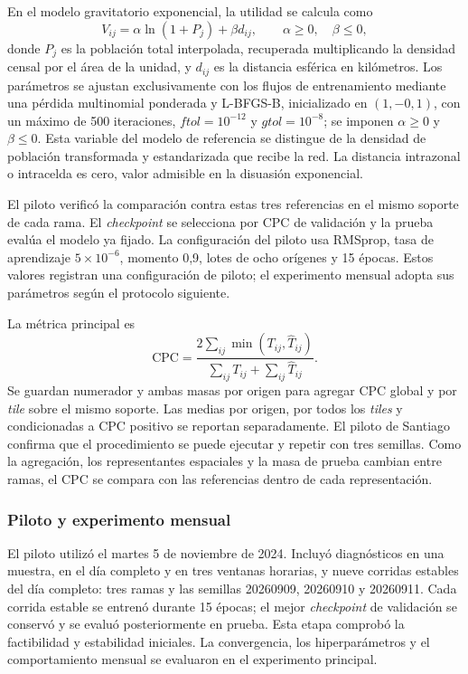 En el modelo gravitatorio exponencial, la utilidad se calcula como
\begin{equation}
    V_{ij}=\alpha\ln(1+P_j)+\beta d_{ij},\qquad \alpha\geq0,\quad\beta\leq0,
    \label{eq:baseline_exponencial}
\end{equation}
donde $P_j$ es la población total interpolada, recuperada multiplicando la densidad censal por el área de la unidad, y $d_{ij}$ es la distancia esférica en kilómetros. Los parámetros se ajustan exclusivamente con los flujos de entrenamiento mediante una pérdida multinomial ponderada y L-BFGS-B, inicializado en $(1,-0{,}1)$, con un máximo de 500 iteraciones, $\textit{ftol}=10^{-12}$ y $\textit{gtol}=10^{-8}$; se imponen $\alpha\geq0$ y $\beta\leq0$. Esta variable del modelo de referencia se distingue de la densidad de población transformada y estandarizada que recibe la red. La distancia intrazonal o intracelda es cero, valor admisible en la disuasión exponencial.

El piloto verificó la comparación contra estas tres referencias en el mismo soporte de cada rama. El \textit{checkpoint} se selecciona por CPC de validación y la prueba evalúa el modelo ya fijado. La configuración del piloto usa RMSprop, tasa de aprendizaje $5\times10^{-6}$, momento 0,9, lotes de ocho orígenes y 15 épocas. Estos valores registran una configuración de piloto; el experimento mensual adopta sus parámetros según el protocolo siguiente.

La métrica principal es
\begin{equation}
    \mathrm{CPC}=\frac{2\sum_{ij}\min(T_{ij},\widehat{T}_{ij})}{\sum_{ij}T_{ij}+\sum_{ij}\widehat{T}_{ij}}.
    \label{eq:cpc_santiago}
\end{equation}
Se guardan numerador y ambas masas por origen para agregar CPC global y por \textit{tile} sobre el mismo soporte. Las medias por origen, por todos los \textit{tiles} y condicionadas a CPC positivo se reportan separadamente. El piloto de Santiago confirma que el procedimiento se puede ejecutar y repetir con tres semillas. Como la agregación, los representantes espaciales y la masa de prueba cambian entre ramas, el CPC se compara con las referencias dentro de cada representación.

\subsubsection{Piloto y experimento mensual}

El piloto utilizó el martes 5 de noviembre de 2024. Incluyó diagnósticos en una muestra, en el día completo y en tres ventanas horarias, y nueve corridas estables del día completo: tres ramas y las semillas 20260909, 20260910 y 20260911. Cada corrida estable se entrenó durante 15 épocas; el mejor \textit{checkpoint} de validación se conservó y se evaluó posteriormente en prueba. Esta etapa comprobó la factibilidad y estabilidad iniciales. La convergencia, los hiperparámetros y el comportamiento mensual se evaluaron en el experimento principal.

